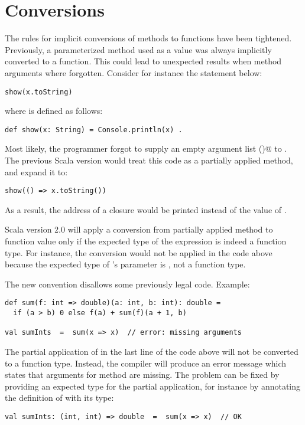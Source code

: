\documentclass[a4paper,11pt,twoside]{article}
\begin{document}
\section{Conversions}

The rules for implicit conversions of methods to functions have been
tightened. Previously, a parameterized method used as a value was always
implicitly converted to a function. This could lead to unexpected
results when method arguments where forgotten. Consider for instance
the statement below:
\begin{lstlisting}
show(x.toString)
\end{lstlisting}
where \lstinline@show@ is defined as follows:
\begin{lstlisting}
def show(x: String) = Console.println(x) .
\end{lstlisting}
Most likely, the programmer forgot to supply an empty argument list
\lstinline@()@ to \lstinline@toString@. The previous Scala version would
treat this code as a partially applied method, and expand it to:
\begin{lstlisting}
show(() => x.toString())
\end{lstlisting}
As a result, the address of a closure would be printed instead of the
value of \lstinline@s@.

Scala version 2.0 will apply a conversion from partially applied
method to function value only if the expected type of the expression
is indeed a function type. For instance, the conversion would not be
applied in the code above because the expected type of
\lstinline@show@'s parameter is \lstinline@String@, not a function
type. 

The new convention disallows some previously legal code. Example:
\begin{lstlisting}
def sum(f: int => double)(a: int, b: int): double =
  if (a > b) 0 else f(a) + sum(f)(a + 1, b)

val sumInts  =  sum(x => x)  // error: missing arguments
\end{lstlisting}
The partial application of \lstinline@sum@ in the last line of
the code above will not be converted to a function type. Instead, the
compiler will produce an error message which states that arguments for method
\lstinline@sum@ are missing. The problem can be fixed by providing an
expected type for the partial application, for instance by annotating
the definition of \lstinline@sumInts@ with its type:
\begin{lstlisting}
val sumInts: (int, int) => double  =  sum(x => x)  // OK
\end{lstlisting}
\end{document}
